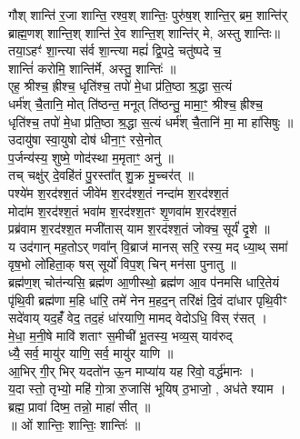 गौश् शान्ति॑ र॒जा शान्ति॒ रश्व॒श् शान्तिः॒ पुरु॑ष॒श् शान्ति॒र् ब्रम॒  शान्ति॑र्\\
ब्राह्म॒णश् शान्ति॒श् शान्ति॑ रे॒व शान्ति॒श् शान्ति॑र् मे, अस्तु शान्तिः॥\\
तया॒ऽहꣳ॑ शा॒न्त्या स॑र्व शा॒न्त्या मह्यं॑ द्वि॒पदे॒ चतु॑ष्पदे च॒ \\
शान्तिं॑ करोमि॒ शान्ति॑र्मे, अस्तु॒ शान्तिः॑ ॥\\
एह॒ श्रीश्च॒ ह्रीश्च॒ धृति॑श्च॒ तपो॑ मे॒धा प्र॑ति॒ष्ठा श्र॒द्धा स॒त्यं \\
धर्म॑श् चै॒तानि॒ मोत् ति॑ष्ठन्त॒ मनूत् ति॑ष्ठन्तु॒ मामा॒॒ꣳ॒ श्रीश्च॒ ह्रीश्च॒ \\
धृति॑श्च॒ तपो॑ मे॒धा प्र॑ति॒ष्ठा श्र॒द्धा स॒त्यं धर्म॑श् चै॒तानि॑ मा॒ मा हा॑सिषुः ॥\\
उदायु॑षा स्वा॒युषो दोष॑ धीना॒ꣳ॒ रसे॒नोत् \\
प॒र्जन्य॑स्य॒ शुष्मे॒ णोद॑स्था म॒मृताꣳ॒ अनु॑ ॥\\
तच् चक्षु॑र् दे॒वहि॑तं पु॒रस्ता᳚त् शु॒क्र मु॒च्चर॑त् ॥\\
पश्ये॑म श॒रद॑श्श॒तं जीवे॑म श॒रद॑श्श॒तं नन्दा॑म श॒रद॑श्श॒तं \\
मोदा॑म श॒रद॑श्श॒तं भवा॑म श॒रद॑श्श॒तꣳ शृ॒णवा॑म श॒रद॑श्श॒तं \\
प्रब्र॑वाम श॒रद॑श्श॒त मजी॑तास् याम श॒रद॑श्श॒तं जोक्च॒ सूर्यं॑ दृ॒शे ॥\\
य उद॑गान् मह॒तोऽर् णवा᳚न् वि॒ब्राज॑ मानस् सरि॒ रस्य॒ मद् ध्या॒थ् समा॑\\
वृष॒भो लो॑हिता॒क् षस् सूर्यो॑ विप॒श् चिन् मन॑सा पुनातु ॥\\
ब्रह्म॑ण॒श् चोत॑न्यसि॒ ब्रह्म॑ण आ॒णीस्थो॒ ब्रह्म॑ण आ॒व प॑नमसि धारि॒तेयं \\
पृ॑थि॒वी ब्रह्म॑णा म॒हि धा॑रि॒ तमे॑ नेन म॒हद॒न् तरि॑क्षं दि॒वं दा॑धार पृथि॒वीꣳ \\
सदे॑वाय् यद॒हंँ वेद॒ तद॒हं धा॑रयाणि॒ मामद् वेदोऽधि॒ विस् र॑सत् । \\
मे॒धा॒ म॒नी॒षे मावि॑ शताꣳ स॒मीची॑ भू॒तस्य॒ भव्य॒स् याव॑रुद् \\
ध्यै॒ सर्व॒ मायु॑र याणि॒ सर्व॒ मायु॑र याणि ॥\\
आ॒भिर् गी॒र् भिर् यदतो॑न ऊ॒न माप्या॑य यह रिवो॒ वर्द्ध॑मानः । \\
य॒दा स्तो॒ तृभ्यो॒ महि॑ गो॒त्रा रु॒जासि॑ भूयिष् ठ॒भाजो॒ , अध॑ते श्याम ।\\
ब्रह्म॒ प्रावा॑ दिष्म॒ तन्नो॒ माहा॑ सीत् ॥\\
॥ ओं शान्तिः॒ शान्तिः॒ शान्तिः॑ ॥\\

